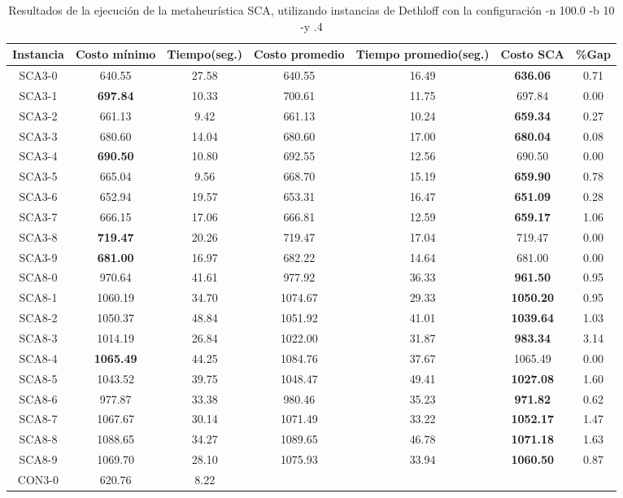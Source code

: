 \begin{table}[ht]
\caption{Resultados de la ejecución de la metaheurística SCA, utilizando instancias de Dethloff con la configuración -n 100.0 -b 10 -y .4}
\centering
\small
\begin{tabular}{c c c c c c c}
\hline\hline
Instancia & Costo mínimo & Tiempo(seg.) & Costo promedio & Tiempo promedio(seg.) & Costo SCA & \%Gap \\ [0.5ex]
\hline
SCA3-0 & 640.55 & 27.58 & 
640.55 & 16.49 & \bf{636.06} & 
0.71\\SCA3-1 & \bf{697.84} & 10.33 & 
700.61 & 11.75 & 697.84 & 0.00\\
SCA3-2 & 661.13 & 9.42 & 
661.13 & 10.24 & \bf{659.34} & 
0.27\\SCA3-3 & 680.60 & 14.04 & 
680.60 & 17.00 & \bf{680.04} & 
0.08\\SCA3-4 & \bf{690.50} & 10.80 & 
692.55 & 12.56 & 690.50 & 0.00\\
SCA3-5 & 665.04 & 9.56 & 
668.70 & 15.19 & \bf{659.90} & 
0.78\\SCA3-6 & 652.94 & 19.57 & 
653.31 & 16.47 & \bf{651.09} & 
0.28\\SCA3-7 & 666.15 & 17.06 & 
666.81 & 12.59 & \bf{659.17} & 
1.06\\SCA3-8 & \bf{719.47} & 20.26 & 
719.47 & 17.04 & 719.47 & 0.00\\
SCA3-9 & \bf{681.00} & 16.97 & 
682.22 & 14.64 & 681.00 & 0.00\\
SCA8-0 & 970.64 & 41.61 & 
977.92 & 36.33 & \bf{961.50} & 
0.95\\SCA8-1 & 1060.19 & 34.70 & 
1074.67 & 29.33 & \bf{1050.20} & 
0.95\\SCA8-2 & 1050.37 & 48.84 & 
1051.92 & 41.01 & \bf{1039.64} & 
1.03\\SCA8-3 & 1014.19 & 26.84 & 
1022.00 & 31.87 & \bf{983.34} & 
3.14\\SCA8-4 & \bf{1065.49} & 44.25 & 
1084.76 & 37.67 & 1065.49 & 0.00\\
SCA8-5 & 1043.52 & 39.75 & 
1048.47 & 49.41 & \bf{1027.08} & 
1.60\\SCA8-6 & 977.87 & 33.38 & 
980.46 & 35.23 & \bf{971.82} & 
0.62\\SCA8-7 & 1067.67 & 30.14 & 
1071.49 & 33.22 & \bf{1052.17} & 
1.47\\SCA8-8 & 1088.65 & 34.27 & 
1089.65 & 46.78 & \bf{1071.18} & 
1.63\\SCA8-9 & 1069.70 & 28.10 & 
1075.93 & 33.94 & \bf{1060.50} & 
0.87\\CON3-0 & 620.76 & 8.22 & 

\end{tabular}
\end{table}
